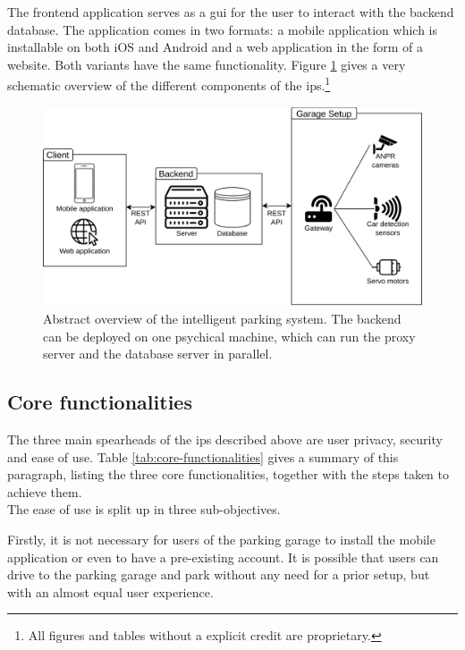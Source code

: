 The frontend application serves as a \ac{gui} for the user to interact with the backend database. The application comes in two formats: a mobile application which is installable on both iOS and Android and a web application in the form of a website. Both variants have the same functionality. Figure \ref{fig:abstract-diagram} gives a very schematic overview of the different components of the \ac{ips}.\footnote{All figures and tables without a explicit credit are proprietary.}

\begin{figure}[htp]
    \centering
    \includegraphics[width=12cm]{images/abstract_diagram.drawio.png}
    \caption[Abstract overview of the intelligent parking system.]{Abstract overview of the intelligent parking system. The backend can be deployed on one psychical machine, which can run the proxy server and the database server in parallel.}
    \label{fig:abstract-diagram}
\end{figure}


\subsection{Core functionalities}\label{sec:core-functionalities}
The three main spearheads of the \ac{ips} described above are user privacy, security and ease of use. Table \ref{tab:core-functionalities} gives a summary of this paragraph, listing the three core functionalities, together with the steps taken to achieve them.\\ 

The ease of use is split up in three sub-objectives.

\ind Firstly, it is not necessary for users of the parking garage to install the mobile application or even to have a pre-existing account. It is possible that users can drive to the parking garage and park without any need for a prior setup, but with an almost equal user experience.

